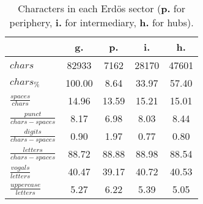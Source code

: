 \begin{table}[h!]
\begin{center}
\begin{tabular}{| l || c | c | c | c |}\hline
 & {\bf g.} & {\bf p.} & {\bf i.} & {\bf h.} \\\hline\hline
$chars$ & 82933  & 7162  & 28170  & 47601 \\
$chars_{\%}$ & 100.00  & 8.64  & 33.97  & 57.40 \\\hline
$\frac{spaces}{chars}$ & 14.96  & 13.59  & 15.21  & 15.01 \\
$\frac{punct}{chars-spaces}$ & 8.17  & 6.98  & 8.03  & 8.44 \\
$\frac{digits}{chars-spaces}$ & 0.90  & 1.97  & 0.77  & 0.80 \\\hline
$\frac{letters}{chars-spaces}$ & 88.72  & 88.88  & 88.98  & 88.54 \\
$\frac{vogals}{letters}$ & 40.47  & 39.17  & 40.72  & 40.53 \\
$\frac{uppercase}{letters}$ & 5.27  & 6.22  & 5.39  & 5.05 \\\hline
\end{tabular}
\caption{Characters in each Erd\"os sector ({{\bf p.}} for periphery, {{\bf i.}} for intermediary, 
    {{\bf h.}} for hubs).}
\end{center}
\end{table}